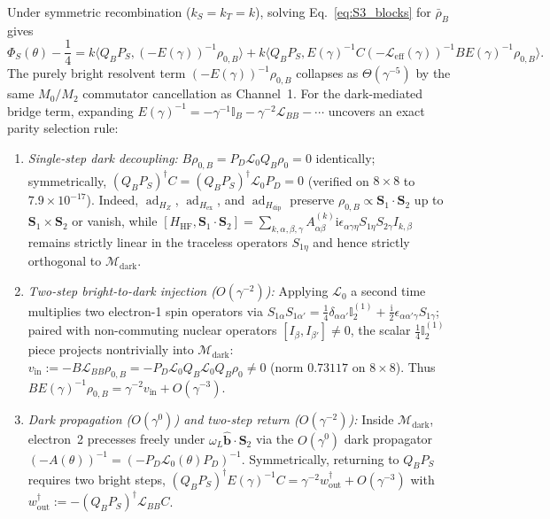 \documentclass[onecolumn,10pt,notitlepage,amsmath,amssymb,floatfix]{revtex4-2}
\theoremstyle{plain}
\theoremstyle{definition}
\newcommand{\ii}{\mathrm{i}}
\newcommand{\ad}{\operatorname{ad}}
\newcommand{\PS}{P_S}
\newcommand{\HZ}{H_Z}
\newcommand{\HHF}{H_{\mathrm{HF}}}
\newcommand{\Hex}{H_{\mathrm{ex}}}
\newcommand{\Hdip}{H_{\mathrm{dip}}}
\begin{document}
Under symmetric recombination ($k_S = k_T = k$), solving Eq.~\eqref{eq:S3_blocks} for $\bar{\rho}_B$ gives
\[
\Phi_S(\theta) - \frac{1}{4} = k\langle Q_B\PS, (-E(\gamma))^{-1}\rho_{0,B}\rangle
+ k\langle Q_B\PS, E(\gamma)^{-1} C (-\mathcal{L}_{\mathrm{eff}}(\gamma))^{-1} B E(\gamma)^{-1}\rho_{0,B}\rangle.
\]
The purely bright resolvent term $(-E(\gamma))^{-1}\rho_{0,B}$ collapses as $\Theta(\gamma^{-5})$ by the same $M_0/M_2$ commutator cancellation as Channel~1. For the dark-mediated bridge term, expanding $E(\gamma)^{-1} = -\gamma^{-1}\mathbb{I}_B - \gamma^{-2}\mathcal{L}_{BB} - \cdots$ uncovers an exact parity selection rule:
\begin{enumerate}[label=(\roman*),leftmargin=1.8em,itemsep=1pt]
\item \emph{Single-step dark decoupling:} $B \rho_{0,B} = P_D \mathcal{L}_0 Q_B \rho_0 = 0$ identically; symmetrically, $(Q_B\PS)^\dagger C = (Q_B\PS)^\dagger \mathcal{L}_0 P_D = 0$ (verified on $8\times 8$ to $7.9\times 10^{-17}$). Indeed, $\ad_{\HZ}$, $\ad_{\Hex}$, and $\ad_{\Hdip}$ preserve $\rho_{0,B} \propto \mathbf{S}_1\cdot\mathbf{S}_2$ up to $\mathbf{S}_1\times\mathbf{S}_2$ or vanish, while $[\HHF, \mathbf{S}_1\cdot\mathbf{S}_2] = \sum_{k,\alpha,\beta,\gamma} A^{(k)}_{\alpha\beta}\ii\epsilon_{\alpha\gamma\eta} S_{1\eta}S_{2\gamma} I_{k,\beta}$ remains strictly linear in the traceless operators $S_{1\eta}$ and hence strictly orthogonal to $\mathcal{M}_{\mathrm{dark}}$.
\item \emph{Two-step bright-to-dark injection ($O(\gamma^{-2})$):} Applying $\mathcal{L}_0$ a second time multiplies two electron-1 spin operators via $S_{1\alpha}S_{1\alpha'} = \frac{1}{4}\delta_{\alpha\alpha'}\mathbb{I}_2^{(1)} + \frac{\ii}{2}\epsilon_{\alpha\alpha'\gamma}S_{1\gamma}$; paired with non-commuting nuclear operators $[I_\beta, I_{\beta'}] \neq 0$, the scalar $\frac{1}{4}\mathbb{I}_2^{(1)}$ piece projects nontrivially into $\mathcal{M}_{\mathrm{dark}}$: $v_{\mathrm{in}} := -B \mathcal{L}_{BB} \rho_{0,B} = -P_D \mathcal{L}_0 Q_B \mathcal{L}_0 Q_B \rho_0 \neq 0$ (norm $0.73117$ on $8\times 8$). Thus $B E(\gamma)^{-1}\rho_{0,B} = \gamma^{-2} v_{\mathrm{in}} + O(\gamma^{-3})$.
\item \emph{Dark propagation ($O(\gamma^0)$) and two-step return ($O(\gamma^{-2})$):} Inside $\mathcal{M}_{\mathrm{dark}}$, electron~2 precesses freely under $\omega_L\hat{\mathbf{b}}\cdot\mathbf{S}_2$ via the $O(\gamma^0)$ dark propagator $(-A(\theta))^{-1} = (-P_D\mathcal{L}_0(\theta)P_D)^{-1}$. Symmetrically, returning to $Q_B\PS$ requires two bright steps, $(Q_B\PS)^\dagger E(\gamma)^{-1} C = \gamma^{-2} w_{\mathrm{out}}^\dagger + O(\gamma^{-3})$ with $w_{\mathrm{out}}^\dagger := -(Q_B\PS)^\dagger \mathcal{L}_{BB} C$.
\end{enumerate}
\end{document}
